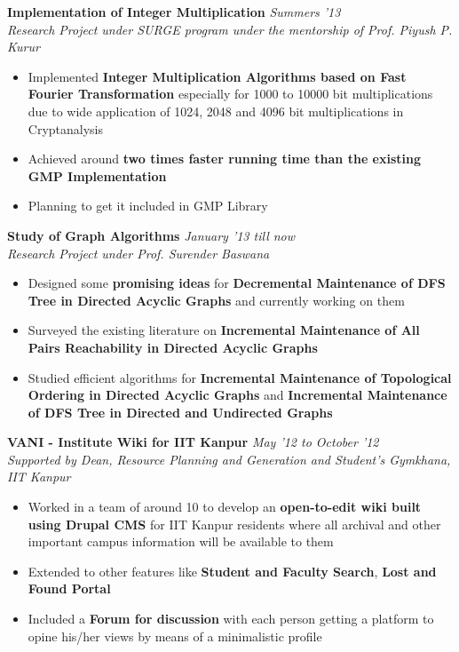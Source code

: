 \documentclass[9pt]{article}
\newenvironment{changemargin}[2]{%
  \begin{list}{}{%
    \setlength{\topsep}{0pt}%
    \setlength{\leftmargin}{#1}%
    \setlength{\rightmargin}{#2}%
    \setlength{\listparindent}{\parindent}%
    \setlength{\itemindent}{\parindent}%
    \setlength{\parsep}{\parskip}%
  }%
  \item[]}{\end{list}
}
\newenvironment{body} {
	\vspace*{-16pt}
	\begin{changemargin}{-0.6in}{-0.65in}
  }	
	{\end{changemargin}
}
\begin{document}
\begin{body}
	\vspace{14pt}
	\textbf{Implementation of Integer Multiplication} \hfill \emph{Summers '13}\\
	\emph{Research Project under SURGE program under the mentorship of Prof. Piyush P. Kurur}
	\begin{itemize}
		\item{Implemented \textbf{Integer Multiplication Algorithms based on Fast Fourier Transformation} especially for 1000 to 10000 bit multiplications due to wide application of 1024, 2048 and 4096 bit multiplications in Cryptanalysis}
		\item{Achieved around \textbf{two times faster running time than the existing GMP Implementation}}
		\item{Planning to get it included in GMP Library}
	\end{itemize}
	\smallskip
	\textbf{Study of Graph Algorithms} \hfill \emph{January '13 till now}\\
	\emph{Research Project under Prof. Surender Baswana}
	\begin{itemize}
		\item{Designed some \textbf{promising ideas} for \textbf{Decremental Maintenance of DFS Tree in Directed Acyclic Graphs} and currently working on them}
		\item{Surveyed the existing literature on \textbf{Incremental Maintenance of All Pairs Reachability in Directed Acyclic Graphs}}
		\item{Studied efficient algorithms for \textbf{Incremental Maintenance of Topological Ordering in Directed Acyclic Graphs} and \textbf{Incremental Maintenance of DFS Tree in Directed and Undirected Graphs}}
	\end{itemize}
	\smallskip
	\textbf{VANI - Institute Wiki for IIT Kanpur} \hfill \emph{May '12 to October '12}\\
	\emph{Supported by Dean, Resource Planning and Generation and Student's Gymkhana, IIT Kanpur}
	\begin{itemize}
		\item{Worked in a team of around 10 to develop an \textbf{open-to-edit wiki built using Drupal CMS} for IIT Kanpur residents where all archival and other important campus information will be available to them}
		\item{Extended to other features like \textbf{Student and Faculty Search},  \textbf{Lost and Found Portal}}
		\item{Included a \textbf{Forum for discussion} with each person getting a platform to opine his/her views by means of a minimalistic profile}

\end{itemize}
\end{body}
\end{document}
